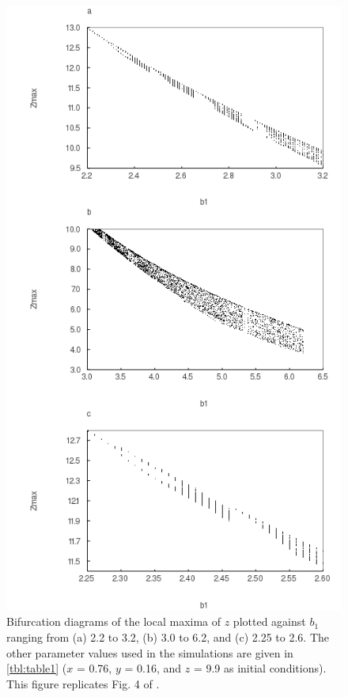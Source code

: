 \newpage

\begin{figure}
  \centering
  \includegraphics[scale=0.7]{figures/fig4.png}
  \caption{Bifurcation diagrams of the local maxima of $z$ plotted against $b_1$ ranging from (a) 2.2 to 3.2, (b) 3.0 to 6.2, and (c) 2.25 to 2.6. The other parameter values used in the simulations are given in \autoref{tbl:table1} ($x$ = 0.76, $y$ = 0.16, and $z$ = 9.9 as initial conditions). This figure replicates Fig. 4 of \citet{hastings1991}.}
  \label{fig:fig4}
\end{figure}

